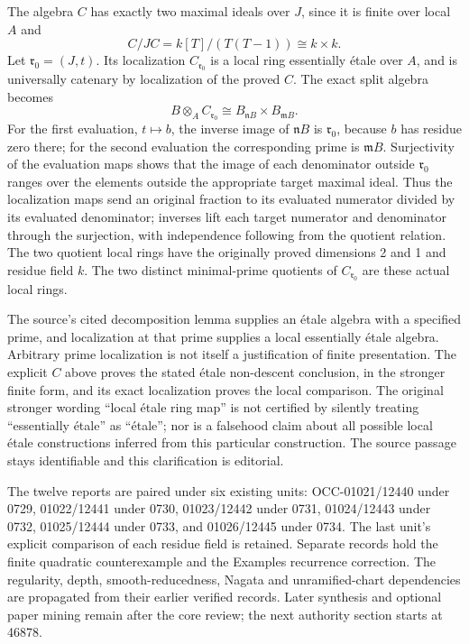The algebra \(C\) has exactly two maximal ideals over \(J\), since it is finite over local \(A\) and \[
 C/JC=k[T]/(T(T-1))\cong k\times k.
\] Let \(\mathfrak r_0=(J,t)\). Its localization \(C_{\mathfrak r_0}\) is a local ring essentially étale over \(A\), and is universally catenary by localization of the proved \(C\). The exact split algebra becomes \[
 B\otimes_AC_{\mathfrak r_0}
 \cong B_{\mathfrak nB}\times B_{\mathfrak mB}.
\] For the first evaluation, \(t\mapsto b\), the inverse image of \(\mathfrak nB\) is \(\mathfrak r_0\), because \(b\) has residue zero there; for the second evaluation the corresponding prime is \(\mathfrak mB\). Surjectivity of the evaluation maps shows that the image of each denominator outside \(\mathfrak r_0\) ranges over the elements outside the appropriate target maximal ideal. Thus the localization maps send an original fraction to its evaluated numerator divided by its evaluated denominator; inverses lift each target numerator and denominator through the surjection, with independence following from the quotient relation. The two quotient local rings have the originally proved dimensions 2 and 1 and residue field \(k\). The two distinct minimal-prime quotients of \(C_{\mathfrak r_0}\) are these actual local rings.

The source's cited decomposition lemma supplies an étale algebra with a specified prime, and localization at that prime supplies a local essentially étale algebra. Arbitrary prime localization is not itself a justification of finite presentation. The explicit \(C\) above proves the stated étale non-descent conclusion, in the stronger finite form, and its exact localization proves the local comparison. The original stronger wording ``local étale ring map'' is not certified by silently treating ``essentially étale'' as ``étale''; nor is a falsehood claim about all possible local étale constructions inferred from this particular construction. The source passage stays identifiable and this clarification is editorial.

The twelve reports are paired under six existing units: OCC-01021/12440 under 0729, 01022/12441 under 0730, 01023/12442 under 0731, 01024/12443 under 0732, 01025/12444 under 0733, and 01026/12445 under 0734. The last unit's explicit comparison of each residue field is retained. Separate records hold the finite quadratic counterexample and the Examples recurrence correction. The regularity, depth, smooth-reducedness, Nagata and unramified-chart dependencies are propagated from their earlier verified records. Later synthesis and optional paper mining remain after the core review; the next authority section starts at 46878.

